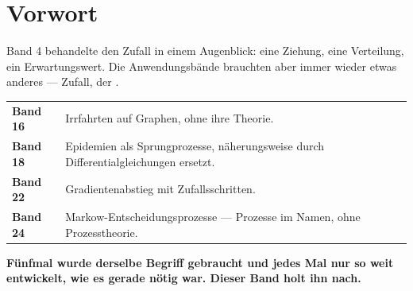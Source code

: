 \chapter*{Vorwort}

\begin{merksatz}
Band 4 behandelte den Zufall in einem Augenblick: eine Ziehung, eine Verteilung, ein Erwartungswert. Die Anwendungsbände brauchten aber immer wieder etwas anderes --- Zufall, der .

\begin{center}
{\small
\renewcommand{\arraystretch}{1.5}
\begin{tabular}{@{}P{2.2cm}P{6.4cm}@{}}
\toprule
\textbf{Band 16} & Irrfahrten auf Graphen, ohne ihre Theorie.\\
\textbf{Band 18} & Epidemien als Sprungprozesse, näherungsweise durch Differentialgleichungen ersetzt.\\
\textbf{Band 22} & Gradientenabstieg mit Zufallsschritten.\\
\textbf{Band 24} & Markow-Entscheidungsprozesse --- Prozesse im Namen, ohne Prozesstheorie.\\
\bottomrule
\end{tabular}}
\end{center}

\begin{center}
\begin{minipage}{0.9\textwidth}
\textbf{Fünfmal wurde derselbe Begriff gebraucht und jedes Mal nur so weit entwickelt, wie es gerade nötig war. Dieser Band holt ihn nach.}
\end{minipage}
\end{center}
\end{merksatz}

